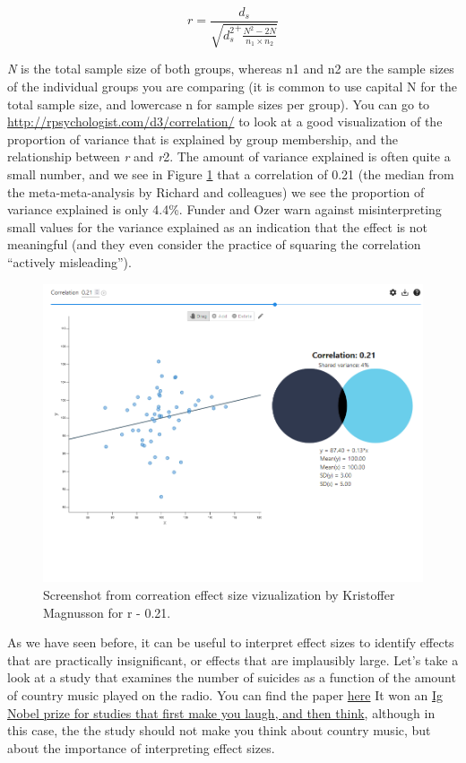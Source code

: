 \documentclass[
]{krantz}
\begin{document}
\[r = \frac{d_s}{\sqrt{{d_s^{2}}^{+}\frac{N^{2} - 2N}{n_{1} \times n_{2}}}}\]

\emph{N} is the total sample size of both groups, whereas n1 and n2 are the sample sizes of the individual groups you are comparing (it is common to use capital N for the total sample size, and lowercase n for sample sizes per group). You can go to \url{http://rpsychologist.com/d3/correlation/} to look at a good visualization of the proportion of variance that is explained by group membership, and the relationship between \emph{r} and \emph{r}2. The amount of variance explained is often quite a small number, and we see in Figure \ref{fig:sharedvariance} that a correlation of 0.21 (the median from the meta-meta-analysis by Richard and colleagues) we see the proportion of variance explained is only 4.4\%. Funder and Ozer \citeyearpar{funder_evaluating_2019} warn against misinterpreting small values for the variance explained as an indication that the effect is not meaningful (and they even consider the practice of squaring the correlation ``actively misleading'').

\begin{figure}

{\centering \includegraphics[width=1\linewidth]{images/sharedvariance} 

}

\caption{Screenshot from correation effect size vizualization by Kristoffer Magnusson for r - 0.21.}\label{fig:sharedvariance}
\end{figure}

As we have seen before, it can be useful to interpret effect sizes to identify effects that are practically insignificant, or effects that are implausibly large. Let's take a look at a study that examines the number of suicides as a function of the amount of country music played on the radio. You can find the paper \href{https://heinonline.org/HOL/P?h=hein.journals/josf71\&i=227}{here} It won an \href{http://www.abc.net.au/science/articles/2004/10/01/1211441.htm}{Ig Nobel prize for studies that first make you laugh, and then think}, although in this case, the the study should not make you think about country music, but about the importance of interpreting effect sizes.
\end{document}
